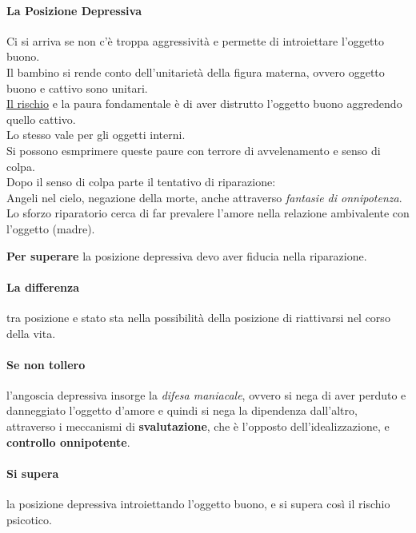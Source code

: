 \documentclass[12pt, a4paper]{article}
\begin{document}
\paragraph{La Posizione Depressiva} Ci si arriva se non c'\`e troppa aggressivit\`a e permette di introiettare l'oggetto buono. \\
Il bambino si rende conto dell'unitariet\`a della figura materna, ovvero oggetto buono e cattivo sono unitari. \\
\underline{Il rischio} e la paura fondamentale \`e di aver distrutto l'oggetto buono aggredendo quello cattivo. \\
Lo stesso vale per gli oggetti interni. \\
Si possono esmprimere queste paure con terrore di avvelenamento e senso di colpa. \\
Dopo il senso di colpa parte il tentativo di riparazione:\\ Angeli nel cielo, negazione della morte, anche attraverso \emph{fantasie di onnipotenza}.\\
Lo sforzo riparatorio cerca di far prevalere l'amore nella relazione ambivalente con l'oggetto (madre).

\textbf{Per superare} la posizione depressiva devo aver fiducia nella riparazione.

\paragraph{La differenza} tra posizione e stato sta nella possibilit\`a della posizione di riattivarsi nel corso della vita.

\paragraph{Se non tollero} l'angoscia depressiva insorge la \emph{difesa maniacale}, ovvero si nega di aver perduto e danneggiato l'oggetto d'amore e quindi si nega la dipendenza dall'altro, attraverso i meccanismi di \textbf{svalutazione}, che \`e l'opposto dell'idealizzazione, e \textbf{controllo onnipotente}.

\paragraph{Si supera} la posizione depressiva introiettando l'oggetto buono, e si supera cos\`i il rischio psicotico.
\\
\bigskip
\\
\bigskip
\end{document}
